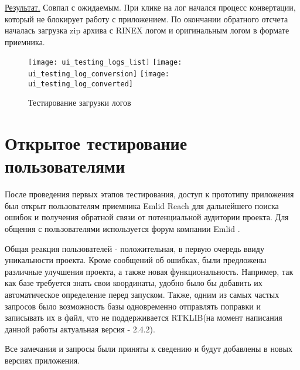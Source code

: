 \underline{Результат.} Совпал с ожидаемым. При клике на лог начался процесс конвертации, который не блокирует работу с приложением. По окончании обратного отсчета началась загрузка zip архива с RINEX логом и оригинальным логом в формате приемника.

\begin{figure}
  \center
  \texttt{[image: ui\_testing\_logs\_list]}
  \texttt{[image: ui\_testing\_log\_conversion]}
  \texttt{[image: ui\_testing\_log\_converted]}
  \caption{Тестирование загрузки логов}
  \label{img:log_download_testing}
\end{figure}

\section{Открытое тестирование пользователями} \label{sect4_3}

После проведения первых этапов тестирования, доступ к прототипу приложения был открыт пользователям приемника Emlid Reach для дальнейшего поиска ошибок и получения обратной связи от потенциальной аудитории проекта. Для общения с пользователями используется форум компании Emlid \cite{emlid-communities}.

Общая реакция пользователей - положительная, в первую очередь ввиду уникальности проекта. Кроме сообщений об ошибках, были предложены различные улучшения проекта, а также новая функциональность. Например, так как базе требуется знать свои координаты, удобно было бы добавить их автоматическое определение перед запуском. Также, одним из самых частых запросов было возможность базы одновременно отправлять поправки и записывать их в файл, что не поддерживается RTKLIB(на момент написания данной работы актуальная версия - 2.4.2).

Все замечания и запросы были приняты к сведению и будут добавлены в новых версиях приложения.



















